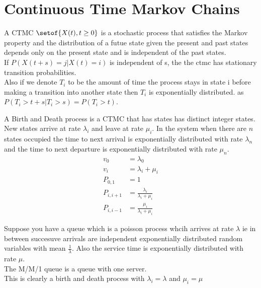 \documentclass[answers,12pt,addpoints]{exam}
\begin{document}
\section*{Continuous Time Markov Chains}
\begin{definition}[CTMC]
    A CTMC $\setof{X(t), t \geq 0}$ is a stochastic process that satisfies the Markov property and the distribution of a futue state given the present and past states depends only on the present state and is independent of the past states.\\
    If $P(X(t+s) = j | X(t) = i)$ is independent of s, the the ctmc has stationary transition probabilities.\\
    Also if we denote $T_i$ to be the amount of time the process stays in state i before making a transition into another state then $T_i$ is exponentially distributed. as $P(T_i > t+s | T_i > s) = P(T_i > t)$.
\end{definition}
\begin{definition}
    A Birth and Death process is a CTMC that has states has distinct integer states. New states arrive at rate $\lambda_i$ and leave at rate $\mu_i$. In the system when there are $n$ states occupied the time to next arrival is exponentially distributed with rate $\lambda_n$ and the time to next departure is exponentially distributed with rate $\mu_n$.\\
    \begin{align*}
        v_0 &= \lambda_0\\
        v_i &= \lambda_i + \mu_i\\
        P_{0,1} &= 1\\
        P_{i,i+1} &= \frac{\lambda_i}{\lambda_i + \mu_i}\\
        P_{i,i-1} &= \frac{\mu_i}{\lambda_i + \mu_i}
    \end{align*}
\end{definition}
\begin{definition}[M/M/1]
    Suppose you have a queue which is a poisson process whcih arrives at rate $\lambda$ ie in between succesuve arrivals are independent exponentially distributed random variables with mean $\frac{1}{\lambda}$. Also the service time is exponentially distributed with rate $\mu$.\\
    The M/M/1 queue is a queue with one server.\\
    This is clearly a birth and death process with $\lambda_i = \lambda$ and $\mu_i = \mu$\\
\end{definition}
\end{document}
